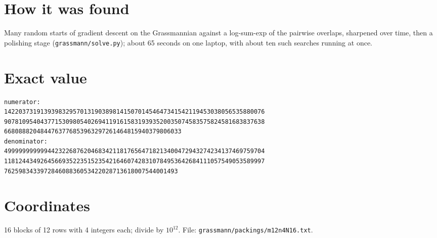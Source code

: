 \documentclass[11pt,a4paper]{article}
\begin{document}
\section{How it was found}
Many random starts of gradient descent on the Grassmannian against a log-sum-exp of the pairwise overlaps, sharpened over time, then a polishing stage (\texttt{grassmann/solve.py}); about 65 seconds on one laptop, with about ten such searches running at once.


\appendix
\section{Exact value}
{\small
\begin{verbatim}
numerator:
142203731913939832957013190389814150701454647341542119453038056535880076
907810954043771530980540269411916158319393520035074583575824581683837638
6680888204844763776853963297261464815940379806033
denominator:
499999999999442322687620468342118176564718213400472943274234137469759704
118124434926456693522351523542164607428310784953642684111057549053589997
762598343397284608836053422028713618007544001493
\end{verbatim}}

\section{Coordinates}
16 blocks of 12 rows with 4 integers each; divide by $10^{12}$. File: \texttt{grassmann/packings/m12n4N16.txt}.
{\tiny
\begin{multicols}{3}
\end{multicols}}
\end{document}
